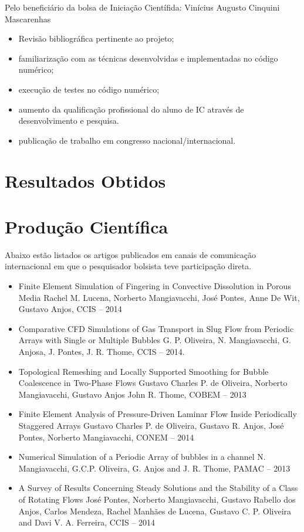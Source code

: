 \documentclass[a4paper,portuges]{article}
\begin{document}
Pelo beneficiário da bolsa de Iniciação Científida: Vinícius Augusto Cinquini Mascarenhas
\begin{itemize}
\item Revisão bibliográfica pertinente ao projeto;
\item familiarização com as técnicas desenvolvidas e implementadas no
código numérico;
\item execução de testes no código numérico;
\item aumento da qualificação profissional do aluno de IC através de
desenvolvimento e pesquisa.
\item publicação de trabalho em congresso nacional/internacional.
\end{itemize}

\section{Resultados Obtidos}

\section{Produção Científica}
Abaixo estão listados os artigos publicados em canais de comunicação
internacional em que o pesquisador bolsista teve participação direta.

\begin{itemize}
	\item Finite Element Simulation of Fingering in Convective Dissolution in
	      Porous Media Rachel M. Lucena, Norberto Mangiavacchi, José Pontes,
	      Anne De Wit, Gustavo Anjos, CCIS -- 2014
	\item Comparative CFD Simulations of Gas Transport in Slug Flow from
		  Periodic Arrays with Single or Multiple Bubbles G. P.
		  Oliveira, N. Mangiavacchi, G. Anjosa, J. Pontes, J. R. Thome,
		  CCIS -- 2014.
	\item Topological Remeshing and Locally Supported Smoothing for
	      Bubble Coalescence in Two-Phase Flows
		  Gustavo Charles P. de Oliveira, Norberto Mangiavacchi, Gustavo Anjos
		  John R. Thome, COBEM -- 2013
	\item Finite Element Analysis of Pressure-Driven Laminar Flow Inside
	      Periodically Staggered Arrays
		  Gustavo Charles P. de Oliveira, Gustavo R. Anjos, José Pontes,
		  Norberto Mangiavacchi, CONEM -- 2014
	\item Numerical Simulation of a Periodic Array of bubbles in a
	      channel
	      N. Mangiavacchi, G.C.P. Oliveira, G. Anjos and J. R. Thome,
		  PAMAC -- 2013
	\item A Survey of Results Concerning Steady Solutions and the
	      Stability of a Class of Rotating Flows
		  José Pontes, Norberto Mangiavacchi, Gustavo Rabello dos Anjos,
		  Carlos Mendeza, Rachel Manhães de Lucena, Gustavo C. P.
		  Oliveira and Davi V. A. Ferreira, CCIS -- 2014
\end{itemize}
\end{document}
